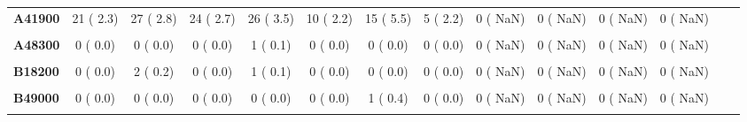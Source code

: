 \documentclass[
]{article}
\begin{document}
\begin{table}[H]
\begin{tabular}[t]{>{\raggedright\arraybackslash}p{5em}ccccccccccccc}
\textbf{A41900} & 21 (  2.3) & 27 (  2.8) & 24 (  2.7) & 26 (  3.5) & 10 (  2.2) & 15 (  5.5) & 5 (  2.2) & 0 (  NaN) & 0 (  NaN) & 0 (  NaN) & 0 (  NaN) &  & \\
\textbf{\cellcolor{gray!10}{A48100}} & \cellcolor{gray!10}{0 (  0.0)} & \cellcolor{gray!10}{0 (  0.0)} & \cellcolor{gray!10}{0 (  0.0)} & \cellcolor{gray!10}{0 (  0.0)} & \cellcolor{gray!10}{1 (  0.2)} & \cellcolor{gray!10}{0 (  0.0)} & \cellcolor{gray!10}{0 (  0.0)} & \cellcolor{gray!10}{0 (  NaN)} & \cellcolor{gray!10}{0 (  NaN)} & \cellcolor{gray!10}{0 (  NaN)} & \cellcolor{gray!10}{0 (  NaN)} & \cellcolor{gray!10}{} & \cellcolor{gray!10}{}\\
\textbf{A48300} & 0 (  0.0) & 0 (  0.0) & 0 (  0.0) & 1 (  0.1) & 0 (  0.0) & 0 (  0.0) & 0 (  0.0) & 0 (  NaN) & 0 (  NaN) & 0 (  NaN) & 0 (  NaN) &  & \\
\textbf{\cellcolor{gray!10}{A49900}} & \cellcolor{gray!10}{0 (  0.0)} & \cellcolor{gray!10}{0 (  0.0)} & \cellcolor{gray!10}{0 (  0.0)} & \cellcolor{gray!10}{1 (  0.1)} & \cellcolor{gray!10}{0 (  0.0)} & \cellcolor{gray!10}{0 (  0.0)} & \cellcolor{gray!10}{0 (  0.0)} & \cellcolor{gray!10}{0 (  NaN)} & \cellcolor{gray!10}{0 (  NaN)} & \cellcolor{gray!10}{0 (  NaN)} & \cellcolor{gray!10}{0 (  NaN)} & \cellcolor{gray!10}{} & \cellcolor{gray!10}{}\\
\textbf{B18200} & 0 (  0.0) & 2 (  0.2) & 0 (  0.0) & 1 (  0.1) & 0 (  0.0) & 0 (  0.0) & 0 (  0.0) & 0 (  NaN) & 0 (  NaN) & 0 (  NaN) & 0 (  NaN) &  & \\
\textbf{\cellcolor{gray!10}{B21200}} & \cellcolor{gray!10}{0 (  0.0)} & \cellcolor{gray!10}{1 (  0.1)} & \cellcolor{gray!10}{0 (  0.0)} & \cellcolor{gray!10}{1 (  0.1)} & \cellcolor{gray!10}{0 (  0.0)} & \cellcolor{gray!10}{0 (  0.0)} & \cellcolor{gray!10}{0 (  0.0)} & \cellcolor{gray!10}{0 (  NaN)} & \cellcolor{gray!10}{0 (  NaN)} & \cellcolor{gray!10}{0 (  NaN)} & \cellcolor{gray!10}{0 (  NaN)} & \cellcolor{gray!10}{} & \cellcolor{gray!10}{}\\
\textbf{B49000} & 0 (  0.0) & 0 (  0.0) & 0 (  0.0) & 0 (  0.0) & 0 (  0.0) & 1 (  0.4) & 0 (  0.0) & 0 (  NaN) & 0 (  NaN) & 0 (  NaN) & 0 (  NaN) &  & \\
\textbf{\cellcolor{gray!10}{C02900}} & \cellcolor{gray!10}{0 (  0.0)} & \cellcolor{gray!10}{0 (  0.0)} & \cellcolor{gray!10}{0 (  0.0)} & \cellcolor{gray!10}{1 (  0.1)} & \cellcolor{gray!10}{0 (  0.0)} & \cellcolor{gray!10}{0 (  0.0)} & \cellcolor{gray!10}{0 (  0.0)} & \cellcolor{gray!10}{0 (  NaN)} & \cellcolor{gray!10}{0 (  NaN)} & \cellcolor{gray!10}{0 (  NaN)} & \cellcolor{gray!10}{0 (  NaN)} & \cellcolor{gray!10}{} & \cellcolor{gray!10}{}\\

\end{tabular}
\end{table}
\end{document}
